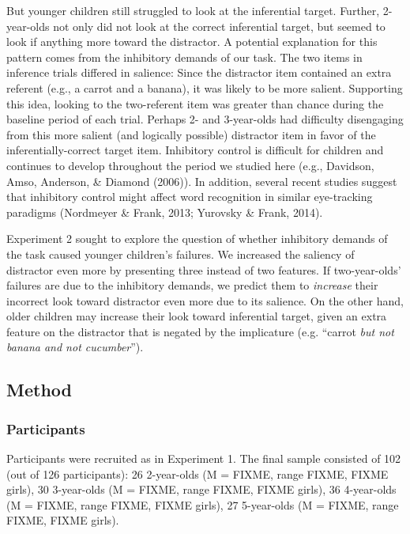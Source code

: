 \documentclass[a4paper,man,apacite,floatsintext]{apa6}
\begin{document}
But younger children still struggled to look at the inferential target.
Further, 2-year-olds not only did not look at the correct inferential
target, but seemed to look if anything more toward the distractor. A
potential explanation for this pattern comes from the inhibitory demands
of our task. The two items in inference trials differed in salience:
Since the distractor item contained an extra referent (e.g., a carrot
and a banana), it was likely to be more salient. Supporting this idea,
looking to the two-referent item was greater than chance during the
baseline period of each trial. Perhaps 2- and 3-year-olds had difficulty
disengaging from this more salient (and logically possible) distractor
item in favor of the inferentially-correct target item. Inhibitory
control is difficult for children and continues to develop throughout
the period we studied here (e.g., Davidson, Amso, Anderson, \& Diamond
(2006)). In addition, several recent studies suggest that inhibitory
control might affect word recognition in similar eye-tracking paradigms
(Nordmeyer \& Frank, 2013; Yurovsky \& Frank, 2014).

Experiment 2 sought to explore the question of whether inhibitory
demands of the task caused younger children's failures. We increased the
saliency of distractor even more by presenting three instead of two
features. If two-year-olds' failures are due to the inhibitory demands,
we predict them to \emph{increase} their incorrect look toward
distractor even more due to its salience. On the other hand, older
children may increase their look toward inferential target, given an
extra feature on the distractor that is negated by the implicature (e.g.
``carrot \emph{but not banana and not cucumber}'').

\subsection{Method}\label{method-1}

\subsubsection{Participants}\label{participants-1}

Participants were recruited as in Experiment 1. The final sample
consisted of 102 (out of 126 participants): 26 2-year-olds (M = FIXME,
range FIXME, FIXME girls), 30 3-year-olds (M = FIXME, range FIXME, FIXME
girls), 36 4-year-olds (M = FIXME, range FIXME, FIXME girls), 27
5-year-olds (M = FIXME, range FIXME, FIXME girls).
\end{document}
